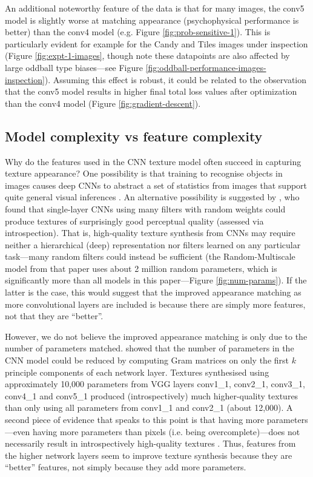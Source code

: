 \documentclass[doc, 11pt,a4paper,natbib]{apa6}\usepackage[]{graphicx}\usepackage[]{color}
\begin{document}
An additional noteworthy feature of the data is that for many images, the conv5 model is slightly worse at matching appearance (psychophysical performance is better) than the conv4 model (e.g. Figure \ref{fig:prob-sensitive-1}).
This is particularly evident for example for the Candy and Tiles images under inspection (Figure \ref{fig:expt-1-images}, though note these datapoints are also affected by large oddball type biases---see Figure \ref{fig:oddball-performance-images-inspection}).
Assuming this effect is robust, it could be related to the observation that the conv5 model results in higher final total loss values after optimization than the conv4 model (Figure \ref{fig:gradient-descent}). 

\subsection{Model complexity vs feature complexity}

Why do the features used in the CNN texture model often succeed in capturing texture appearance?
One possibility is that training to recognise objects in images causes deep CNNs to abstract a set of statistics from images that support quite general visual inferences \citep[transfer learning;][]{donahue_decaf_2013}.
An alternative possibility is suggested by \citet{ustyuzhaninov_texture_2016}, who found that single-layer CNNs using many filters with random weights could produce textures of surprisingly good perceptual quality (assessed via introspection).
That is, high-quality texture synthesis from CNNs may require neither a hierarchical (deep) representation nor filters learned on any particular task---many random filters could instead be sufficient (the Random-Multiscale model from that paper uses about 2 million random parameters, which is significantly more than all models in this paper---Figure \ref{fig:num-params}). 
If the latter is the case, this would suggest that the improved appearance matching as more convolutional layers are included is because there are simply more features, not that they are ``better''. 

However, we do not believe the improved appearance matching is only due to the number of parameters matched.
\citet{gatys_texture_2015-1} showed that the number of parameters in the CNN model could be reduced by computing Gram matrices on only the first $k$ principle components of each network layer.
Textures synthesised using approximately 10,000 parameters from VGG layers conv1\_1, conv2\_1, conv3\_1, conv4\_1 and conv5\_1 produced (introspectively) much higher-quality textures than only using all parameters from conv1\_1 and conv2\_1 (about 12,000). 
A second piece of evidence that speaks to this point is that having more parameters---even having more parameters than pixels (i.e. being overcomplete)---does not necessarily result in introspectively high-quality textures \citep{ustyuzhaninov_texture_2016}.
Thus, features from the higher network layers seem to improve texture synthesis because they are ``better'' features, not simply because they add more parameters.
\end{document}

